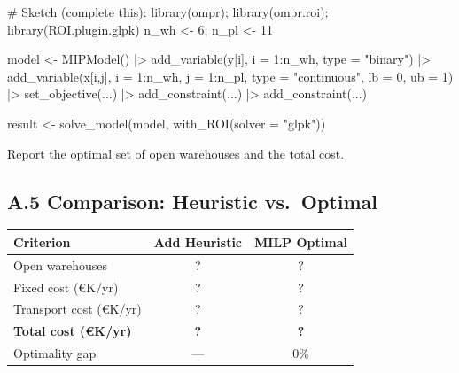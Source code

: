 \documentclass[
  a4paper,
]{article}
\newenvironment{Shaded}{\begin{snugshade}}{\end{snugshade}}
\newcommand{\AttributeTok}[1]{\textcolor[rgb]{0.40,0.45,0.13}{#1}}
\newcommand{\CommentTok}[1]{\textcolor[rgb]{0.37,0.37,0.37}{#1}}
\newcommand{\DecValTok}[1]{\textcolor[rgb]{0.68,0.00,0.00}{#1}}
\newcommand{\FunctionTok}[1]{\textcolor[rgb]{0.28,0.35,0.67}{#1}}
\newcommand{\NormalTok}[1]{\textcolor[rgb]{0.00,0.23,0.31}{#1}}
\newcommand{\OtherTok}[1]{\textcolor[rgb]{0.00,0.23,0.31}{#1}}
\newcommand{\SpecialCharTok}[1]{\textcolor[rgb]{0.37,0.37,0.37}{#1}}
\newcommand{\StringTok}[1]{\textcolor[rgb]{0.13,0.47,0.30}{#1}}
\begin{document}
\begin{Shaded}
\begin{Highlighting}[]
\CommentTok{\# Sketch (complete this):}
\FunctionTok{library}\NormalTok{(ompr); }\FunctionTok{library}\NormalTok{(ompr.roi); }\FunctionTok{library}\NormalTok{(ROI.plugin.glpk)}
\NormalTok{n\_wh }\OtherTok{\textless{}{-}} \DecValTok{6}\NormalTok{; n\_pl }\OtherTok{\textless{}{-}} \DecValTok{11}

\NormalTok{model }\OtherTok{\textless{}{-}} \FunctionTok{MIPModel}\NormalTok{() }\SpecialCharTok{|\textgreater{}}
  \FunctionTok{add\_variable}\NormalTok{(y[i], }\AttributeTok{i =} \DecValTok{1}\SpecialCharTok{:}\NormalTok{n\_wh, }\AttributeTok{type =} \StringTok{"binary"}\NormalTok{) }\SpecialCharTok{|\textgreater{}}
  \FunctionTok{add\_variable}\NormalTok{(x[i,j], }\AttributeTok{i =} \DecValTok{1}\SpecialCharTok{:}\NormalTok{n\_wh, }\AttributeTok{j =} \DecValTok{1}\SpecialCharTok{:}\NormalTok{n\_pl,}
               \AttributeTok{type =} \StringTok{"continuous"}\NormalTok{, }\AttributeTok{lb =} \DecValTok{0}\NormalTok{, }\AttributeTok{ub =} \DecValTok{1}\NormalTok{) }\SpecialCharTok{|\textgreater{}}
  \FunctionTok{set\_objective}\NormalTok{(...) }\SpecialCharTok{|\textgreater{}}
  \FunctionTok{add\_constraint}\NormalTok{(...) }\SpecialCharTok{|\textgreater{}}
  \FunctionTok{add\_constraint}\NormalTok{(...)}

\NormalTok{result }\OtherTok{\textless{}{-}} \FunctionTok{solve\_model}\NormalTok{(model, }\FunctionTok{with\_ROI}\NormalTok{(}\AttributeTok{solver =} \StringTok{"glpk"}\NormalTok{))}
\end{Highlighting}
\end{Shaded}

Report the optimal set of open warehouses and the total cost.

\subsection{A.5 Comparison: Heuristic
vs.~Optimal}\label{a.5-comparison-heuristic-vs.-optimal}

\begin{longtable}[]{@{}lcc@{}}
\toprule\noalign{}
Criterion & Add Heuristic & MILP Optimal \\
\midrule\noalign{}
\endhead
\bottomrule\noalign{}
\endlastfoot
Open warehouses & ? & ? \\
Fixed cost (€K/yr) & ? & ? \\
Transport cost (€K/yr) & ? & ? \\
\textbf{Total cost (€K/yr)} & \textbf{?} & \textbf{?} \\
Optimality gap & --- & 0\% \\
\end{longtable}
\end{document}
